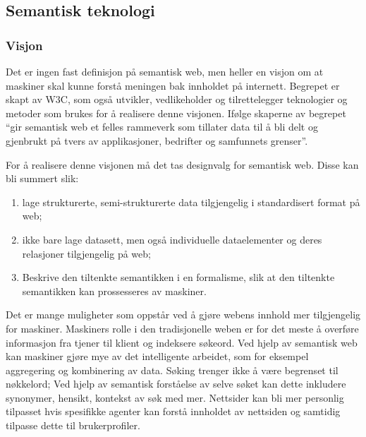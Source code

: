\subsection{Semantisk teknologi}
\subsubsection{Visjon}
Det er ingen fast definisjon på semantisk web, men heller en visjon om at maskiner skal kunne forstå meningen bak innholdet på internett. Begrepet er skapt av W3C, som også  utvikler, vedlikeholder og tilrettelegger teknologier og metoder som brukes for å realisere denne visjonen. Ifølge skaperne av begrepet “gir semantisk web et felles rammeverk som tillater data til å bli delt og gjenbrukt på tvers av applikasjoner, bedrifter og samfunnets grenser”\citep{W3C_semantic_web}.  

For å realisere denne visjonen må det tas designvalg for semantisk web. Disse kan bli summert slik: 
\begin{enumerate}
    \item lage strukturerte, semi-strukturerte data tilgjengelig i standardisert format på web;
    \item ikke bare lage datasett, men også individuelle dataelementer og deres relasjoner 	tilgjengelig på web;
    \item Beskrive den tiltenkte semantikken i en formalisme, slik at den tiltenkte semantikken kan prossesseres av maskiner\citep{webprimer}.
\end{enumerate}
Det er mange muligheter som oppstår ved å gjøre webens innhold mer tilgjengelig for maskiner. Maskiners rolle i den tradisjonelle weben er for det meste å overføre informasjon fra tjener til klient og indeksere søkeord. Ved hjelp av semantisk web kan maskiner gjøre mye av det intelligente arbeidet, som for eksempel aggregering og kombinering av data. Søking trenger ikke å være begrenset til nøkkelord; Ved hjelp av semantisk forståelse av selve søket kan dette inkludere synonymer, hensikt, kontekst av søk med mer. Nettsider kan bli mer personlig tilpasset hvis spesifikke agenter kan forstå innholdet av nettsiden og samtidig tilpasse dette til brukerprofiler.    
